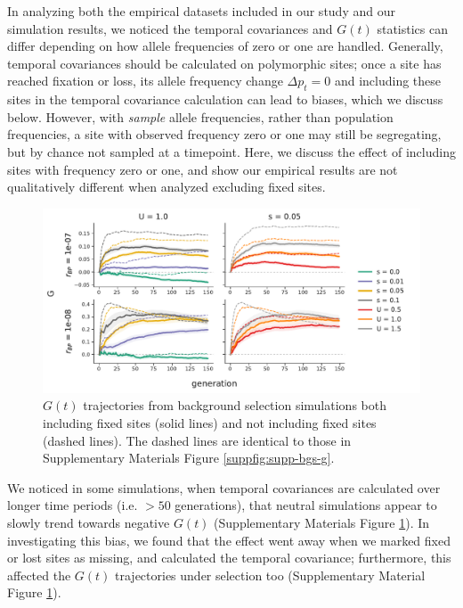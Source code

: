 \documentclass[11pt]{article}
\begin{document}
{{In analyzing both the empirical datasets included in our study and our
simulation results, we noticed the temporal covariances and $G(t)$ statistics
can differ depending on how allele frequencies of zero or one are handled.
Generally, temporal covariances should be calculated on polymorphic sites; once
a site has reached fixation or loss, its allele frequency change $\Delta p_t =
0$ and including these sites in the temporal covariance calculation can lead to
biases, which we discuss below. However, with \emph{sample} allele frequencies,
rather than population frequencies, a site with observed frequency zero or one
may still be segregating, but by chance not sampled at a timepoint. Here, we
discuss the effect of including sites with frequency zero or one, and show our
empirical results are not qualitatively different when analyzed excluding fixed
sites.


\begin{figure}[!ht]
  \centering
  \includegraphics[width=\textwidth]{figures/fig-bgs-G-with-fixations.pdf}

  \caption{$G(t)$ trajectories from background selection simulations both
  including fixed sites (solid lines) and not including fixed sites (dashed
lines). The dashed lines are identical to those in Supplementary Materials
Figure \ref{suppfig:supp-bgs-g}. }

  \label{suppfig:supp-bgs-g-fix}
\end{figure}

We noticed in some simulations, when temporal covariances are calculated over
longer time periods (i.e. $>50$ generations), that neutral simulations appear
to slowly trend towards negative $G(t)$ (Supplementary Materials Figure
\ref{suppfig:supp-bgs-g-fix}). In investigating this bias, we found that the
effect went away when we marked fixed or lost sites as missing, and calculated
the temporal covariance; furthermore, this affected the $G(t)$ trajectories
under selection too (Supplementary Material Figure
\ref{suppfig:supp-bgs-g-fix}). 

}}
\end{document}
